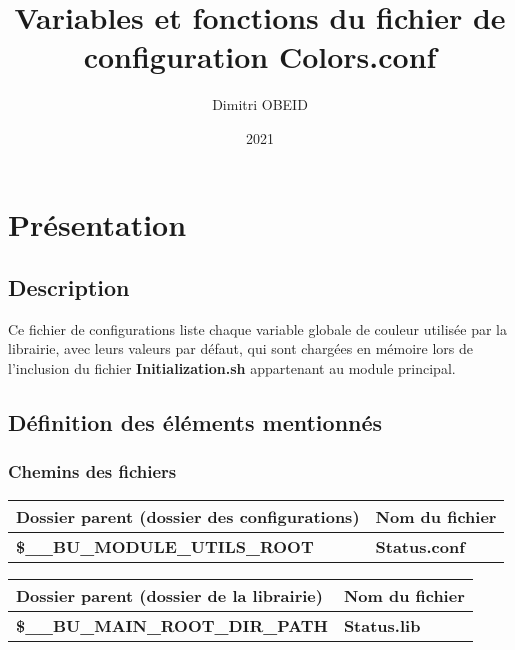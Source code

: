 \documentclass[a4paper,10pt]{article}
\title{\color{sec1}Variables et fonctions du fichier de configuration \color{path}Colors.conf}\color{text}
\author{Dimitri OBEID}
\date{2021}
\begin{document}
\maketitle
\newpage

\hypertarget{contents}{}
\tableofcontents
\newpage

\color{sec1}
\section{Présentation}\color{text}

\color{sec2}
\subsection{Description}\color{text}

\begin{justify}
    Ce fichier de configurations liste chaque variable globale de couleur utilisée par la librairie, avec leurs valeurs par défaut, qui sont chargées en mémoire lors de l'inclusion du fichier \textbf{\color{path}Initialization.sh} appartenant au module principal.
\end{justify}



\color{sec2}
\subsection{Définition des éléments mentionnés}\color{text}

\color{sec3}
\subsubsection{Chemins des fichiers}\color{text}

\begin{justify}
    \begin{tabular}{|l|l|}
        \hline
        \textbf{Dossier parent (dossier des configurations)} & \textbf{Nom du fichier}\\
        \hline
        \textbf{\color{vars}\$\_\_BU\_MODULE\_UTILS\_ROOT} & \textbf{\color{path}Status.conf}\\
        \hline
    \end{tabular}


    \begin{tabular}{|l|l|}
        \hline
        \textbf{Dossier parent (dossier de la librairie)} & \textbf{Nom du fichier}\\
        \hline
        \textbf{\color{vars}\$\_\_BU\_MAIN\_ROOT\_DIR\_PATH} & \textbf{\color{path}Status.lib}\\
        \hline
    \end{tabular}
\end{justify}
\end{document}
